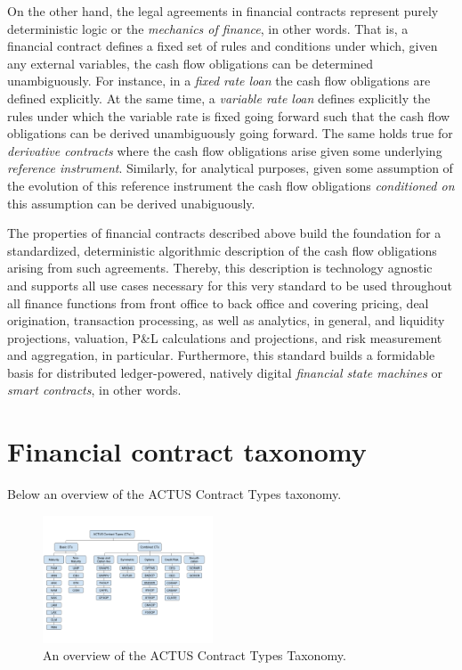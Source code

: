 \documentclass[9pt,oneside]{amsart}
\begin{document}
\begin{multicols}{2}
On the other hand, the legal agreements in financial contracts represent purely deterministic logic or the \textit{mechanics of finance}, in other words. That is, a financial contract defines a fixed set of rules and conditions under which, given any external variables, the cash flow obligations can be determined unambiguously. For instance, in a \textit{fixed rate loan} the cash flow obligations are defined explicitly. At the same time, a \textit{variable rate loan} defines explicitly the rules under which the variable rate is fixed going forward such that the cash flow obligations can be derived unambiguously going forward. The same holds true for \textit{derivative contracts} where the cash flow obligations arise given some underlying \textit{reference instrument}. Similarly, for analytical purposes, given some assumption of the evolution of this reference instrument the cash flow obligations \textit{conditioned on} this assumption can be derived unabiguously. 

The properties of financial contracts described above build the foundation for a standardized, deterministic algorithmic description of the cash flow obligations arising from such agreements. Thereby, this description is technology agnostic and supports all use cases necessary for this very standard to be used throughout all finance functions from front office to back office and covering pricing, deal origination, transaction processing, as well as analytics, in general, and liquidity projections, valuation, P\&L calculations and projections, and risk measurement and aggregation, in particular. Furthermore, this standard builds a formidable basis for distributed ledger-powered, natively digital \textit{financial state machines} or \textit{smart contracts}, in other words.



\section{Financial contract taxonomy}\label{sec:taxonomy}

Below an overview of the ACTUS Contract Types taxonomy.


\begin{figure}[H]
	\centering
	\includegraphics[width=0.45\textwidth]{./media/taxonomy.png}
	\caption{An overview of the ACTUS Contract Types Taxonomy.}
	\label{fig:taxonomy}
\end{figure}



\end{multicols}
\end{document}
